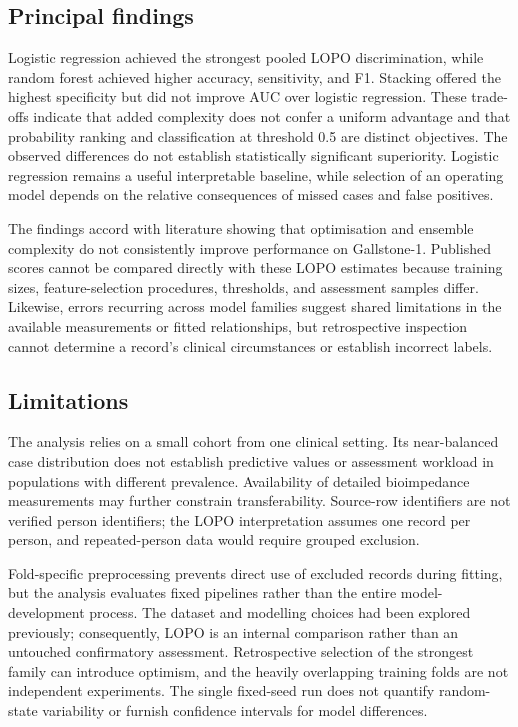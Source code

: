 \subsection{Principal findings}
Logistic regression achieved the strongest pooled LOPO discrimination, while random forest achieved higher accuracy, sensitivity, and F1. Stacking offered the highest specificity but did not improve AUC over logistic regression. These trade-offs indicate that added complexity does not confer a uniform advantage and that probability ranking and classification at threshold 0.5 are distinct objectives. The observed differences do not establish statistically significant superiority. Logistic regression remains a useful interpretable baseline, while selection of an operating model depends on the relative consequences of missed cases and false positives.

The findings accord with literature showing that optimisation and ensemble complexity do not consistently improve performance on Gallstone-1. Published scores cannot be compared directly with these LOPO estimates because training sizes, feature-selection procedures, thresholds, and assessment samples differ. Likewise, errors recurring across model families suggest shared limitations in the available measurements or fitted relationships, but retrospective inspection cannot determine a record's clinical circumstances or establish incorrect labels.

\subsection{Limitations}
The analysis relies on a small cohort from one clinical setting. Its near-balanced case distribution does not establish predictive values or assessment workload in populations with different prevalence. Availability of detailed bioimpedance measurements may further constrain transferability. Source-row identifiers are not verified person identifiers; the LOPO interpretation assumes one record per person, and repeated-person data would require grouped exclusion.

Fold-specific preprocessing prevents direct use of excluded records during fitting, but the analysis evaluates fixed pipelines rather than the entire model-development process. The dataset and modelling choices had been explored previously; consequently, LOPO is an internal comparison rather than an untouched confirmatory assessment. Retrospective selection of the strongest family can introduce optimism, and the heavily overlapping training folds are not independent experiments. The single fixed-seed run does not quantify random-state variability or furnish confidence intervals for model differences.

